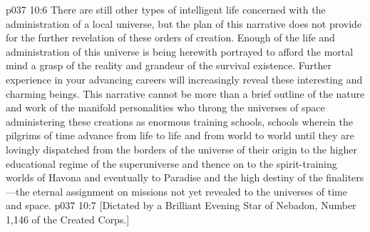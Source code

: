 \vs p037 10:6 There are still other types of intelligent life concerned with the administration of a local universe, but the plan of this narrative does not provide for the further revelation of these orders of creation. Enough of the life and administration of this universe is being herewith portrayed to afford the mortal mind a grasp of the reality and grandeur of the survival existence. Further experience in your advancing careers will increasingly reveal these interesting and charming beings. This narrative cannot be more than a brief outline of the nature and work of the manifold personalities who throng the universes of space administering these creations as enormous training schools, schools wherein the pilgrims of time advance from life to life and from world to world until they are lovingly dispatched from the borders of the universe of their origin to the higher educational regime of the superuniverse and thence on to the spirit\hyp{}training worlds of Havona and eventually to Paradise and the high destiny of the finaliters---the eternal assignment on missions not yet revealed to the universes of time and space.
\vsetoff
\vs p037 10:7 [Dictated by a Brilliant Evening Star of Nebadon, Number 1,146 of the Created Corps.]\plusone
